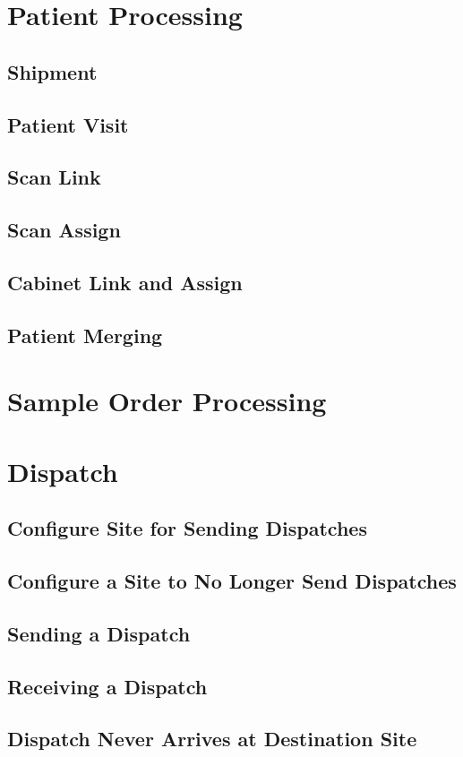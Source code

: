 \chapter{Patient Processing}
\section{Shipment}
\section{Patient Visit}
\section{Scan Link}
\section{Scan Assign}
\section{Cabinet Link and Assign}
\section{Patient Merging}
\chapter{Sample Order Processing}
\chapter{Dispatch}
\section{Configure Site for Sending Dispatches}
\section{Configure a Site to No Longer Send Dispatches}
\section{Sending a Dispatch}
\section{Receiving a Dispatch}
\section{Dispatch Never Arrives at Destination Site}
